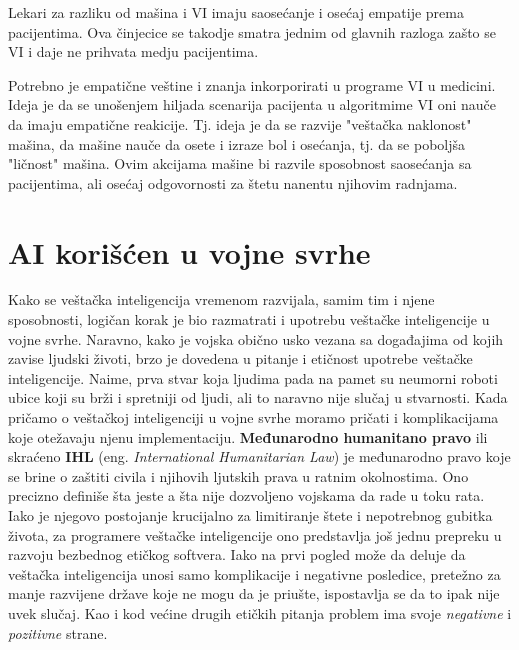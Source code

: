 \documentclass[a4paper]{article}
\begin{document}
Lekari za razliku od mašina i VI imaju saosećanje i osećaj empatije prema pacijentima. Ova činjecice se takodje smatra jednim od glavnih razloga zašto se VI i daje ne prihvata medju pacijentima.

Potrebno je empatične veštine i znanja inkorporirati u programe VI u medicini. Ideja je da se unošenjem hiljada scenarija pacijenta u algoritmime VI oni nauče da imaju empatične reakicije. Tj. ideja je da se razvije "veštačka naklonost" mašina, da mašine nauče da osete i izraze bol i osećanja, tj. da se poboljša "ličnost" mašina. Ovim akcijama mašine bi razvile sposobnost saosećanja sa pacijentima, ali osećaj odgovornosti za štetu nanentu njihovim radnjama.




\section{AI korišćen u vojne svrhe}
\label{sec: AI korišćen u vojne svrhe}
Kako se veštačka inteligencija vremenom razvijala, samim tim i njene sposobnosti, logičan korak je bio razmatrati i upotrebu veštačke inteligencije u vojne svrhe. Naravno, kako je vojska obično usko vezana sa događajima od kojih zavise ljudski životi, brzo je dovedena u pitanje i etičnost upotrebe veštačke inteligencije. Naime, prva stvar koja ljudima pada na pamet su neumorni roboti ubice koji su brži i spretniji od ljudi, ali to naravno nije slučaj u stvarnosti.
\newline
\newline
Kada pričamo o veštačkoj inteligenciji u vojne svrhe moramo pričati i komplikacijama koje otežavaju njenu implementaciju. \textbf{Međunarodno humanitano pravo} ili skraćeno \textbf{IHL} (eng. \textit{International Humanitarian Law}) je međunarodno pravo koje se brine o zaštiti civila i njihovih ljutskih prava u ratnim okolnostima. Ono precizno definiše šta jeste a šta nije dozvoljeno vojskama da rade u toku rata. Iako je njegovo postojanje krucijalno za limitiranje štete i nepotrebnog gubitka života, za programere veštačke inteligencije ono predstavlja još jednu prepreku u razvoju bezbednog etičkog softvera.
\newline
\newline
Iako na prvi pogled može da deluje da veštačka inteligencija unosi samo komplikacije i negativne posledice, pretežno za manje razvijene države koje ne mogu da je priušte, ispostavlja se da to ipak nije uvek slučaj. Kao i kod većine drugih etičkih pitanja problem ima svoje \emph{negativne} i \emph{pozitivne} strane.
\end{document}
